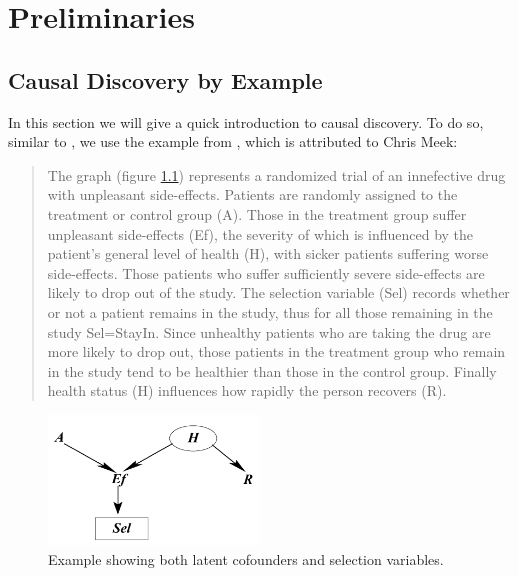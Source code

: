 \documentclass[11pt,a4paper]{report}
\theoremstyle{definition}
\begin{document}
\chapter{Preliminaries}\label{preliminaries}
\section{Causal Discovery by Example}\label{sec:example}


In this section we will give a quick introduction to causal discovery. To
do so, similar to \cite{zhangCompletenessOrientationRules2008}, we use the
example from \cite{richardsonChainGraphsSymmetric1998}, which is
attributed to Chris Meek:

\begin{quote}
  The graph (figure \ref{fig:example}) represents a randomized trial of an
  innefective drug with unpleasant side-effects. Patients are randomly
  assigned to the treatment or control group (A). Those in the treatment
  group suffer unpleasant side-effects (Ef), the severity of which is
  influenced by the patient's general level of health (H), with sicker
  patients suffering worse side-effects. Those patients who suffer
  sufficiently severe side-effects are likely to drop out of the study.
  The selection variable (Sel) records whether or not a patient remains in
  the study, thus for all those remaining in the study Sel=StayIn. Since
  unhealthy patients who are taking the drug are more likely to drop out,
  those patients in the treatment group who remain in the study tend to be
  healthier than those in the control group. Finally health status (H)
  influences how rapidly the person recovers (R).
\end{quote}

\begin{figure}
  \centering
  \includegraphics[width=0.5\textwidth]{imgs/example1.png}
  \caption{Example showing both latent cofounders and selection variables.}
  \label{fig:example}
\end{figure}
\end{document}
